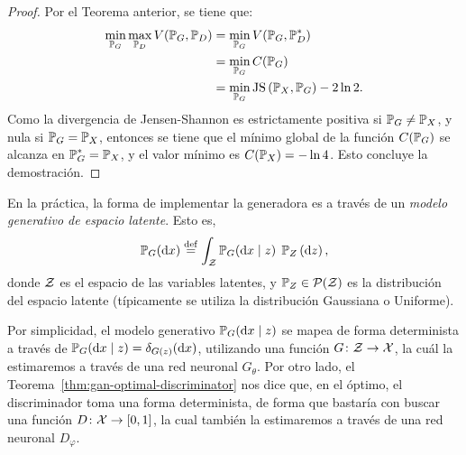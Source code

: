 {{\begin{proof}
    Por el Teorema anterior, se tiene que:
    \begin{align*}
        \min_{\Prob_G} \max_{\Prob_D} V(\Prob_G, \Prob_D)
         & = \min_{\Prob_G} V(\Prob_G, \Prob_D^\ast)         \\
         & = \min_{\Prob_G} C(\Prob_G)                       \\
         & = \min_{\Prob_G} \JS{\Prob_X}{\Prob_G} - 2 \ln 2.
    \end{align*}
    Como la divergencia de Jensen-Shannon es estrictamente positiva si $\Prob_G \neq \Prob_X$, y nula si $\Prob_G = \Prob_X$, entonces se tiene que el mínimo global de la función $C(\Prob_G)$ se alcanza en $\Prob_G^\ast = \Prob_X$, y el valor mínimo es $C(\Prob_X) = - \ln 4$. Esto concluye la demostración.
\end{proof}

En la práctica, la forma de implementar la generadora es a través de un \emph{modelo generativo de espacio latente}. Esto es,
\begin{equation}
    \Prob_G (\dd x) \eqdef \int_\cZ \Prob_G(\dd x \mid z) \; \Prob_Z \left( \dd z\right),
\end{equation}
donde $\mathcal{Z}$ es el espacio de las variables latentes, y $\Prob_Z \in \ProbSpace[\cZ] $ es la distribución del espacio latente (típicamente se utiliza la distribución Gaussiana o Uniforme).

Por simplicidad, el modelo generativo $\Prob_G (\dd x \mid z)$ se mapea de forma determinista a través de $\Prob_G (\dd x \mid z) = \delta_{G(z)}(\dd x)$, utilizando una función $G\colon \mathcal{Z} \to \mathcal{X}$, la cuál la estimaremos a través de una red neuronal $G_\theta$. Por otro lado, el Teorema~\ref{thm:gan-optimal-discriminator} nos dice que, en el óptimo, el discriminador toma una forma determinista, de forma que bastaría con buscar una función $D\colon\mathcal{X}\to [0, 1]$, la cual también la estimaremos a través de una red neuronal $D_\varphi$.


}}
